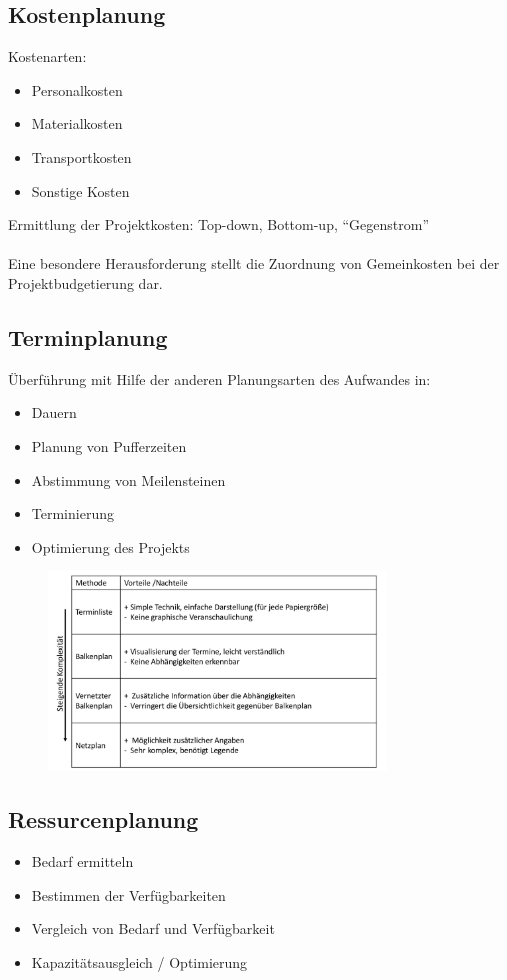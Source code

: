\documentclass[11pt,a4paper]{article}
\begin{document}
\subsection{Kostenplanung}
Kostenarten:
\begin{itemize}
\item Personalkosten
\item Materialkosten
\item Transportkosten
\item Sonstige Kosten
\end{itemize}
Ermittlung der Projektkosten: Top-down, Bottom-up, ``Gegenstrom''\\
\\
Eine besondere Herausforderung stellt die Zuordnung von Gemeinkosten
bei der Projektbudgetierung dar.

\subsection{Terminplanung}
Überführung mit Hilfe der anderen Planungsarten des Aufwandes in:
\begin{itemize}
\item Dauern
\item Planung von Pufferzeiten
\item Abstimmung von Meilensteinen
\item Terminierung
\item Optimierung des Projekts
\end{itemize}

\begin{figure}[H]
	\includegraphics[width=0.8\textwidth]{terminplan}
\end{figure}
\subsection{Ressurcenplanung}
\begin{itemize}
\item Bedarf ermitteln
\item Bestimmen der Verfügbarkeiten
\item Vergleich von Bedarf und Verfügbarkeit
\item Kapazitätsausgleich / Optimierung
\end{itemize}
\end{document}
